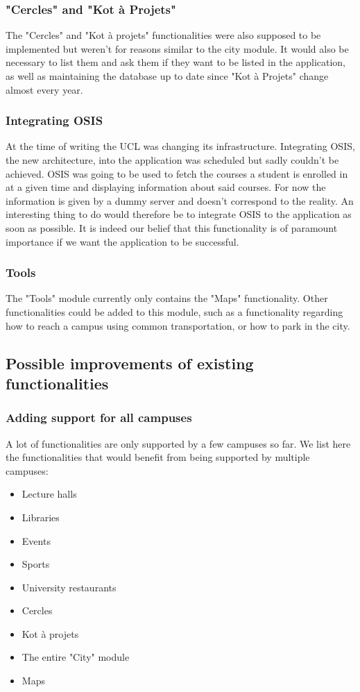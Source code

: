 \documentclass{eplmastersthesis}
\begin{document}
\subsubsection{"Cercles" and "Kot à Projets"}
The "Cercles" and "Kot à projets" functionalities were also supposed to be implemented but weren't for reasons similar to the city module. It would also be necessary to list them and ask them if they want to be listed in the application, as well as maintaining the database up to date since "Kot à Projets" change almost every year.
\subsubsection{Integrating OSIS}
At the time  of writing the UCL was changing its infrastructure. Integrating OSIS, the new architecture, into the application was scheduled but sadly couldn't be achieved. OSIS was going to be used to fetch the courses a student is enrolled in at a given time and displaying information about said courses. 
For now the information is given by a dummy server and doesn't correspond to the reality. An interesting thing to do would therefore be to integrate OSIS to the application as soon as possible.  It is indeed our belief that this functionality is of paramount importance if we want the application to be successful. 
\subsubsection{Tools}
The "Tools" module currently only contains the "Maps" functionality. Other functionalities could be added to this module, such as a functionality regarding how to reach a campus using common transportation, or how to park in the city.
\subsection{Possible improvements of existing functionalities}
\subsubsection{Adding support for all campuses}
A lot of functionalities are only supported by a few campuses so far. We list here the functionalities that would benefit from being supported by multiple campuses:
\begin{itemize}
\item Lecture halls
\item Libraries
\item Events
\item Sports
\item University restaurants
\item Cercles
\item Kot à projets
\item The entire "City" module
\item Maps
\end{itemize}
\end{document}
